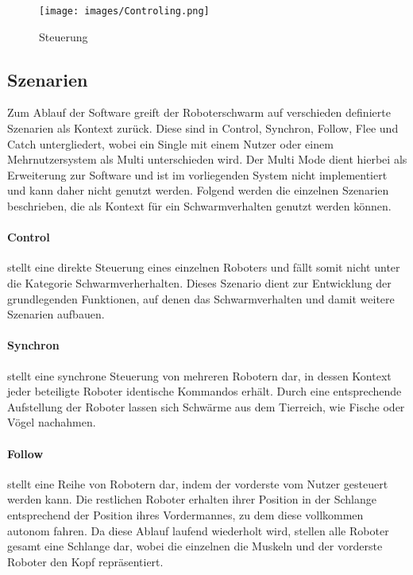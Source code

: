 \begin{figure}[h]
	\centering
	\texttt{[image: images/Controling.png]}
	\caption{Steuerung}
	\label{fig:steuerung}
\end{figure}

\subsection{Szenarien}\label{szenarien}

Zum Ablauf der Software greift der Roboterschwarm auf verschieden definierte Szenarien als Kontext zurück. Diese sind in Control, Synchron, Follow, Flee und Catch untergliedert, wobei ein Single mit einem Nutzer oder einem Mehrnutzersystem als Multi unterschieden wird. Der Multi Mode dient hierbei als Erweiterung zur Software und ist im vorliegenden System nicht implementiert und kann daher nicht genutzt werden. Folgend werden die einzelnen Szenarien beschrieben, die als Kontext für ein Schwarmverhalten genutzt werden können.

\paragraph{Control}

stellt eine direkte Steuerung eines einzelnen Roboters und fällt somit nicht unter die Kategorie Schwarmverherhalten. Dieses Szenario dient zur Entwicklung der grundlegenden Funktionen, auf denen das Schwarmverhalten und damit weitere Szenarien aufbauen.

\paragraph{Synchron}

stellt eine synchrone Steuerung von mehreren Robotern dar, in dessen Kontext jeder beteiligte Roboter identische Kommandos erhält. Durch eine entsprechende Aufstellung der Roboter lassen sich Schwärme aus dem Tierreich, wie Fische oder Vögel nachahmen.

\paragraph{Follow}

stellt eine Reihe von Robotern dar, indem der vorderste vom Nutzer gesteuert werden kann. Die restlichen Roboter erhalten ihrer Position in der Schlange entsprechend der Position ihres Vordermannes, zu dem diese vollkommen autonom fahren. Da diese Ablauf laufend wiederholt wird, stellen alle Roboter gesamt eine Schlange dar, wobei die einzelnen die Muskeln und der vorderste Roboter den Kopf repräsentiert.

